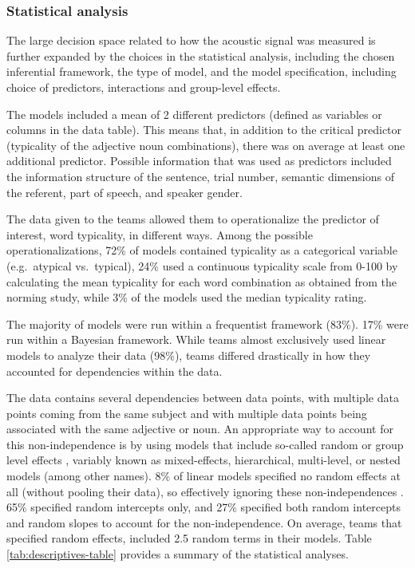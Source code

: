 \documentclass[Review,times,sageh]{sagej}
\begin{document}
\vspace{0.2in}

\hypertarget{statistical-analysis}{%
\subsubsection{Statistical analysis}\label{statistical-analysis}}

The large decision space related to how the acoustic signal was measured is further expanded by the choices in the statistical analysis, including the chosen inferential framework, the type of model, and the model specification, including choice of predictors, interactions and group-level effects.

The models included a mean of 2 different predictors (defined as variables or columns in the data table).
This means that, in addition to the critical predictor (typicality of the adjective noun combinations), there was on average at least one additional predictor.
Possible information that was used as predictors included the information structure of the sentence, trial number, semantic dimensions of the referent, part of speech, and speaker gender.

The data given to the teams allowed them to operationalize the predictor of interest, word typicality, in different ways.
Among the possible operationalizations, 72\% of models contained typicality as a categorical variable (e.g.~atypical vs.~typical), 24\% used a continuous typicality scale from 0-100 by calculating the mean typicality for each word combination as obtained from the norming study, while 3\% of the models used the median typicality rating.

The majority of models were run within a frequentist framework (83\%).
17\% were run within a Bayesian framework.
While teams almost exclusively used linear models to analyze their data (98\%), teams differed drastically in how they accounted for dependencies within the data.

The data contains several dependencies between data points, with multiple data points coming from the same subject and with multiple data points being associated with the same adjective or noun.
An appropriate way to account for this non-independence is by using models that include so-called random or group level effects \citep[e.g.,][]{gelman2006data, schielzeth2009conclusions}, variably known as mixed-effects, hierarchical, multi-level, or nested models (among other names).
8\% of linear models specified no random effects at all (without pooling their data), so effectively ignoring these non-independences \citep{hurlbert1984pseudoreplication}.
65\% specified random intercepts only, and 27\% specified both random intercepts and random slopes to account for the non-independence.
On average, teams that specified random effects, included 2.5 random terms in their models.
Table \ref{tab:descriptives-table} provides a summary of the statistical analyses.
\end{document}

